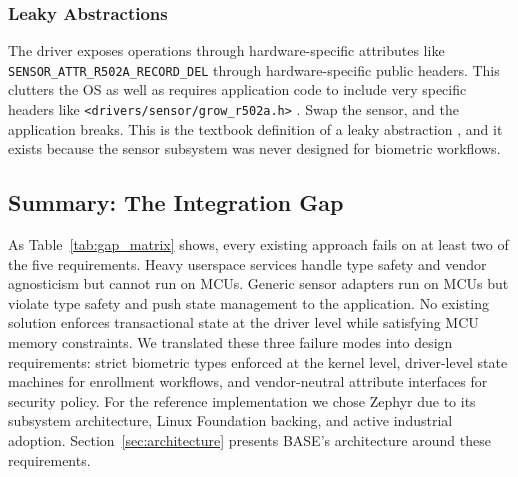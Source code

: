 \subsubsection{Leaky Abstractions}
The driver exposes operations through hardware-specific attributes like \texttt{SENSOR\_ATTR\_R502A\_RECORD\_DEL} through hardware-specific public headers. This clutters the OS as well as requires application code to include very specific headers like \texttt{<drivers/sensor/grow\_r502a.h>} \cite{zephyr_r502a}. Swap the sensor, and the application breaks. This is the textbook definition of a leaky abstraction \cite{zephyr_driver}, and it exists because the sensor subsystem was never designed for biometric workflows.

\subsection{Summary: The Integration Gap}
As Table~\ref{tab:gap_matrix} shows, every existing approach fails on at least two of the five requirements. Heavy userspace services handle type safety and vendor agnosticism but cannot run on MCUs. Generic sensor adapters run on MCUs but violate type safety and push state management to the application. No existing solution enforces transactional state at the driver level while satisfying MCU memory constraints. We translated these three failure modes into design requirements: strict biometric types enforced at the kernel level, driver-level state machines for enrollment workflows, and vendor-neutral attribute interfaces for security policy. For the reference implementation we chose Zephyr due to its subsystem architecture, Linux Foundation backing, and active industrial adoption. Section~\ref{sec:architecture} presents BASE's architecture around these requirements.